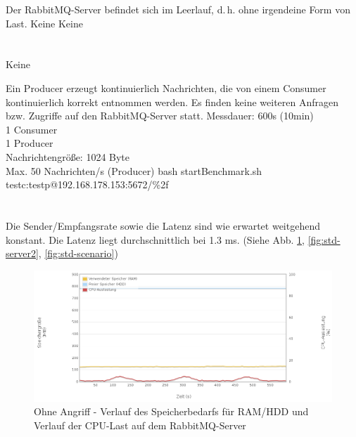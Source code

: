\documentclass[	a4paper,
			11pt,
			oneside,
			parskip]{scrartcl}
\begin{document}
		{Der RabbitMQ-Server befindet sich im Leerlauf, d.\,h. ohne irgendeine Form von Last.}%
		{Keine}%
		{Keine}%
		{%
		 \\
		 \\
		 \\
		}%
		{Keine}
	
		{Ein Producer erzeugt kontinuierlich Nachrichten, die von einem Consumer kontinuierlich korrekt entnommen werden. Es finden keine weiteren Anfragen bzw. Zugriffe auf den RabbitMQ-Server statt.}%
		{%
		 Messdauer: 600s (10min)\\
		 1 Consumer \\
		 1 Producer \\
		 Nachrichtengröße: 1024 Byte\\
		 Max. 50 Nachrichten/s (Producer)
		}%
		{bash startBenchmark.sh testc:testp@192.168.178.153:5672/\%2f}%
		{%
		 \\
		 \\
		 \\
		}%
		{
		 Die Sender/Empfangsrate sowie die Latenz sind wie erwartet weitgehend konstant. Die Latenz liegt durchschnittlich bei 1.3 ms.
		 (Siehe Abb. \ref{fig:std-server1}, \ref{fig:std-server2}, \ref{fig:std-scenario})
		}
		
		\begin{figure}[!htb]
			\centering
			\includegraphics[width=\textwidth]{img/std/std_server1.png}
			\caption{Ohne Angriff - Verlauf des Speicherbedarfs für RAM/HDD und Verlauf der CPU-Last auf dem RabbitMQ-Server}
			\label{fig:std-server1}
		\end{figure}
		
\end{document}
